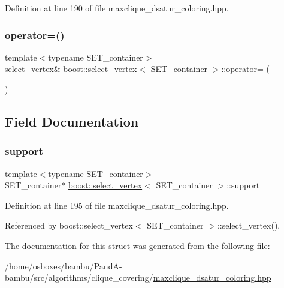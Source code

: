 Definition at line 190 of file maxclique\+\_\+dsatur\+\_\+coloring.\+hpp.

\mbox{\label{structboost_1_1select__vertex_a57cfd6e9139539475890bf7a4058a44d}} 
\subsubsection{\texorpdfstring{operator=()}{operator=()}}
{\footnotesize\ttfamily template$<$typename S\+E\+T\+\_\+container$>$ \\
\hyperlink{structboost_1_1select__vertex}{select\+\_\+vertex}\& \hyperlink{structboost_1_1select__vertex}{boost\+::select\+\_\+vertex}$<$ S\+E\+T\+\_\+container $>$\+::operator= (\begin{DoxyParamCaption}\item[{const \hyperlink{structboost_1_1select__vertex}{select\+\_\+vertex}$<$ S\+E\+T\+\_\+container $>$ \&}]{ }\end{DoxyParamCaption})\hspace{0.3cm}{\ttfamily [delete]}}



\subsection{Field Documentation}
\mbox{\label{structboost_1_1select__vertex_a69e69a634885446fe889fde25d954fa5}} 
\subsubsection{\texorpdfstring{support}{support}}
{\footnotesize\ttfamily template$<$typename S\+E\+T\+\_\+container$>$ \\
S\+E\+T\+\_\+container$\ast$ \hyperlink{structboost_1_1select__vertex}{boost\+::select\+\_\+vertex}$<$ S\+E\+T\+\_\+container $>$\+::support}



Definition at line 195 of file maxclique\+\_\+dsatur\+\_\+coloring.\+hpp.



Referenced by boost\+::select\+\_\+vertex$<$ S\+E\+T\+\_\+container $>$\+::select\+\_\+vertex().



The documentation for this struct was generated from the following file\+:\begin{DoxyCompactItemize}
\item 
/home/osboxes/bambu/\+Pand\+A-\/bambu/src/algorithms/clique\+\_\+covering/\hyperlink{maxclique__dsatur__coloring_8hpp}{maxclique\+\_\+dsatur\+\_\+coloring.\+hpp}\end{DoxyCompactItemize}
